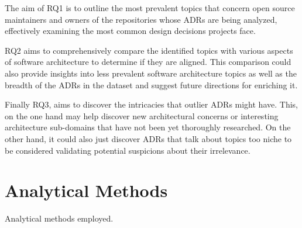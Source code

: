         The aim of RQ1 is to outline the most prevalent topics that concern open source maintainers and owners of the repositories whose ADRs are being analyzed, effectively examining the most common design decisions projects face.
        
        RQ2 aims to comprehensively compare the identified topics with various aspects of software architecture to determine if they are aligned. This comparison could also provide insights into less prevalent software architecture topics as well as the breadth of the ADRs in the dataset and suggest future directions for enriching it.
        
        Finally RQ3, aims to discover the intricacies that outlier ADRs might have. This, on the one hand may help discover new architectural concerns or interesting architecture sub-domains that have not been yet thoroughly researched. On the other hand, it could also just discover ADRs that talk about topics too niche to be considered validating potential suspicions about their irrelevance.

    \section{Analytical Methods}
        Analytical methods employed.